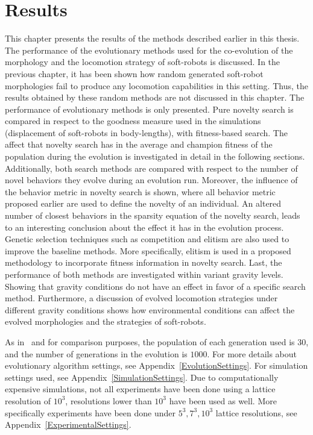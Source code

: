 
\chapter{Results} %

\label{Results} %


This chapter presents the results of the methods described earlier in this thesis. The performance of the evolutionary methods used for the co-evolution of the morphology and the locomotion strategy of soft-robots is discussed. In the previous chapter, it has been shown how random generated soft-robot morphologies fail to produce any locomotion capabilities in this setting. Thus, the results obtained by these random methods are not discussed in this chapter. The performance of evolutionary methods is only presented. Pure novelty search is compared in respect to the goodness measure used in the simulations (displacement of soft-robots in body-lengths), with fitness-based search. The affect that novelty search has in the average and champion fitness of the population during the evolution is investigated in detail in the following sections. Additionally, both search methods are compared with respect to the number of novel behaviors they evolve during an evolution run. Moreover, the influence of the behavior metric in novelty search is shown, where all behavior metric proposed earlier are used to define the novelty of an individual. An altered number of closest behaviors in the sparsity equation of the novelty search, leads to an interesting conclusion about the effect it has in the evolution process. Genetic selection techniques such as competition and elitism are also used to improve the baseline methods. More specifically, elitism is used in a proposed methodology to incorporate fitness information in novelty search. Last, the performance of both methods are investigated within variant gravity levels. Showing that gravity conditions do not have an effect in favor of a specific search method. Furthermore, a discussion of evolved locomotion strategies under different gravity conditions shows how environmental conditions can affect the evolved morphologies and the strategies of soft-robots.

As in~\citep{cheney2013unshackling} and for comparison purposes, the population of each generation used is $30$, and the number of generations in the evolution is $1000$. For more details about evolutionary algorithm settings, see Appendix~\ref{EvolutionSettings}. For simulation settings used, see Appendix~\ref{SimulationSettings}. Due to computationally expensive simulations, not all experiments have been done using a lattice resolution of $10^3$, resolutions lower than $10^3$ have been used as well. More specifically experiments have been done under $5^3, 7^3, 10^3$ lattice resolutions, see Appendix~\ref{ExperimentalSettings}.



